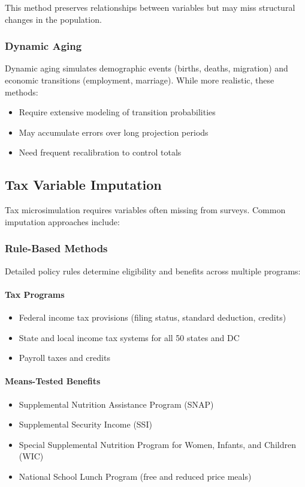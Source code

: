 This method preserves relationships between variables but may miss structural changes in the population.

\subsubsection{Dynamic Aging}

Dynamic aging simulates demographic events (births, deaths, migration) and economic transitions (employment, marriage). While more realistic, these methods:
\begin{itemize}
    \item Require extensive modeling of transition probabilities
    \item May accumulate errors over long projection periods
    \item Need frequent recalibration to control totals
\end{itemize}

\subsection{Tax Variable Imputation}

Tax microsimulation requires variables often missing from surveys. Common imputation approaches include:

\subsubsection{Rule-Based Methods}

Detailed policy rules determine eligibility and benefits across multiple programs:

\paragraph{Tax Programs}
\begin{itemize}
    \item Federal income tax provisions (filing status, standard deduction, credits)
    \item State and local income tax systems for all 50 states and DC
    \item Payroll taxes and credits
\end{itemize}

\paragraph{Means-Tested Benefits}
\begin{itemize}
    \item Supplemental Nutrition Assistance Program (SNAP)
    \item Supplemental Security Income (SSI)
    \item Special Supplemental Nutrition Program for Women, Infants, and Children (WIC)
    \item National School Lunch Program (free and reduced price meals)
\end{itemize}

